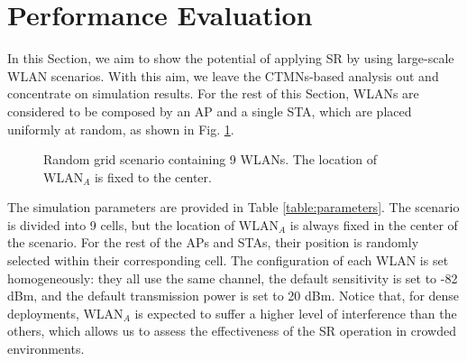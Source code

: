 \documentclass[preprint,12pt]{elsarticle}
\begin{document}
	\section{Performance Evaluation}
	\label{section:performance_evaluation}
	
	In this Section, we aim to show the potential of applying SR by using large-scale WLAN scenarios. With this aim, we leave the CTMNs-based analysis out and concentrate on simulation results. For the rest of this Section, WLANs are considered to be composed by an AP and a single STA, which are placed uniformly at random, as shown in Fig. \ref{fig:random_scenario}. 
	
	\begin{figure}[ht!]
		\centering
		\caption{Random grid scenario containing 9 WLANs. The location of $\text{WLAN}_A$ is fixed to the center.}
		\label{fig:random_scenario}
	\end{figure}
	
	The simulation parameters are provided in Table \ref{table:parameters}. The scenario is divided into 9 cells, but the location of $\text{WLAN}_A$ is always fixed in the center of the scenario. For the rest of the APs and STAs, their position is randomly selected within their corresponding cell. The configuration of each WLAN is set homogeneously: they all use the same channel, the default sensitivity is set to -82 dBm, and the default transmission power is set to 20 dBm. Notice that, for dense deployments, $\text{WLAN}_A$ is expected to suffer a higher level of interference than the others, which allows us to assess the effectiveness of the SR operation in crowded environments.
	
\end{document}
